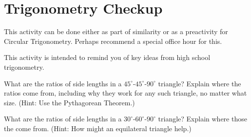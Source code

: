 \newpage 

\section{Trigonometry Checkup}
\begin{teachingnote}
This activity can be done either as part of similarity or as a preactivity for Circular Trigonometry.  Perhaps recommend a special office hour for this.  
\end{teachingnote}
This activity is intended to remind you of key ideas from high school trigonometry. 

\begin{prob}
What are the ratios of side lengths in a $45^\circ$-$45^\circ$-$90^\circ$ triangle?  Explain where the ratios come from, including why they work for any such triangle, no matter what size.  (Hint: Use the Pythagorean Theorem.)
\end{prob}

\vspace{0.1in}

\begin{prob}
What are the ratios of side lengths in a $30^\circ$-$60^\circ$-$90^\circ$ triangle?  Explain where those the come from.  (Hint: How might an equilateral triangle help.)
\end{prob}

\vspace{0.1in}

